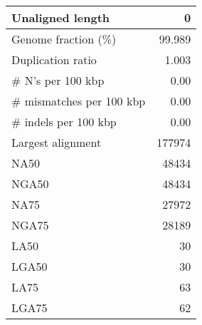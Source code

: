 \documentclass[12pt,a4paper]{article}
\begin{document}
\begin{table}[ht]
\begin{center}
\begin{tabular}{|l*{1}{|r}|}
Unaligned length & 0 \\ \hline
Genome fraction (\%) & 99.989 \\ \hline
Duplication ratio & 1.003 \\ \hline
\# N's per 100 kbp & 0.00 \\ \hline
\# mismatches per 100 kbp & 0.00 \\ \hline
\# indels per 100 kbp & 0.00 \\ \hline
Largest alignment & 177974 \\ \hline
NA50 & 48434 \\ \hline
NGA50 & 48434 \\ \hline
NA75 & 27972 \\ \hline
NGA75 & 28189 \\ \hline
LA50 & 30 \\ \hline
LGA50 & 30 \\ \hline
LA75 & 63 \\ \hline
LGA75 & 62 \\ \hline
\end{tabular}
\end{center}
\end{table}
\end{document}
